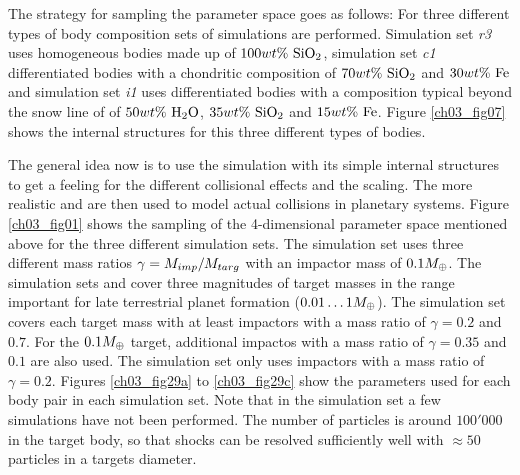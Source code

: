 The strategy for sampling the parameter space goes as follows: For three different types of body composition sets of simulations are performed. Simulation set \emph{r3} uses homogeneous bodies made up of $100 wt\mathrm{\%}~\mathrm{SiO}_2$, simulation set \emph{c1} differentiated bodies with a chondritic composition of $70 wt\mathrm{\%}~\mathrm{SiO}_2$ and $30 wt\mathrm{\%}~\mathrm{Fe}$ and simulation set \emph{i1} uses differentiated bodies with a composition typical beyond the snow line of of $50 wt\mathrm{\%}~\mathrm{H}_2 \mathrm{O}$, $35 wt\mathrm{\%}~\mathrm{SiO}_2$ and $15 wt\mathrm{\%}~\mathrm{Fe}$. Figure \ref{ch03_fig07} shows the internal structures for this three different types of bodies.

The general idea now is to use the \rss simulation with its simple internal structures to get a feeling for the different collisional effects and the scaling. The more realistic \css and \iss are then used to model actual collisions in planetary systems. Figure \ref{ch03_fig01} shows the sampling of the 4-dimensional parameter space mentioned above for the three different simulation sets.  The \rss simulation set uses three different mass ratios $\gamma = M_{imp} / M_{targ}$ with an impactor mass of $0.1 M_{\oplus}$. The simulation sets \css and \iss cover three magnitudes of target masses in the range important for late terrestrial planet formation ($0.01 \dots 1 M_{\oplus}$). The \css simulation set covers each target mass with at least impactors with a mass ratio of $\gamma = 0.2$ and  $0.7$. For the $0.1 M_{\oplus}$ target, additional impactos with a mass ratio of $\gamma = 0.35$ and $0.1$ are also used. The \iss simulation set only uses impactors with a mass ratio of $\gamma = 0.2$. Figures \ref{ch03_fig29a} to \ref{ch03_fig29c} show the parameters used for each body pair in each simulation set. Note that in the \rss simulation set a few simulations have not been performed. The number of particles is around $100'000$ in the target body, so that shocks can be resolved sufficiently well with $\approx 50$ particles in a targets diameter.

